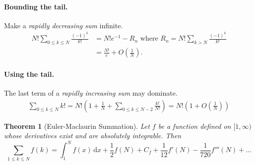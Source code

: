 \documentclass{article}
\newtheorem{theorem}{Theorem}
\begin{document}
\paragraph{Bounding the tail.} Make a \emph{rapidly decreasing sum} infinite.
\begin{align*}
  N!\sum_{0 \leq k \leq N}\frac{(-1)^k}{k!} &= N!e^{-1} - R_n \text{ where }
    R_n = N!\sum_{k > N}\frac{(-1)^k}{k!} \\
    &= \frac{N!}{e} + O\left(\frac{1}{N}\right).
\end{align*}

\paragraph{Using the tail.} The last term of a \emph{rapidly increasing sum}
may dominate. \begin{align*}
  \sum_{0 \leq k \leq N}k! = N!\left(1 + \frac{1}{N} + \sum_{0 \leq k \leq N -
    2}\frac{k!}{N!}\right) = N!\left(1 + O\left(\frac{1}{N}\right)\right)
\end{align*}

\begin{theorem}[Euler-Maclaurin Summation]
  Let $f$ be a function defined on $[1, \infty)$ whose derivatives exist and
  are absolutely integrable. Then \begin{equation*}
    \sum_{1 \leq k \leq N}f(k) = \int_1^N f(x)\,\mathrm{d}x + \frac{1}{2}f(N) +
      C_f + \frac{1}{12}f'(N) - \frac{1}{720}f'''(N) + \ldots
  \end{equation*}
\end{theorem}
\end{document}
